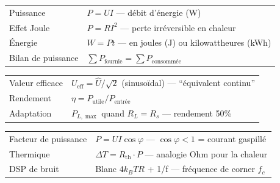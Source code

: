 \documentclass[12pt,a4paper,twoside]{book}
\begin{document}
\begin{bases}[title={\color{white} Résumé --- Les Bases}]
\begin{center}
\renewcommand{\arraystretch}{1.3}
\begin{tabular}{p{4cm}p{9cm}}
\toprule
Puissance & $P = UI$ --- débit d'énergie (W) \\
Effet Joule & $P = RI^2$ --- perte irréversible en chaleur \\
Énergie & $W = Pt$ --- en joules (J) ou kilowattheures (kWh) \\
Bilan de puissance & $\sum P_{\text{fournie}} = \sum P_{\text{consommée}}$ \\
\bottomrule
\end{tabular}
\end{center}
\end{bases}

\begin{approfondissement}[title={\color{white} Résumé --- Approfondissement}]
\begin{center}
\renewcommand{\arraystretch}{1.3}
\begin{tabular}{p{4cm}p{9cm}}
\toprule
Valeur efficace & $U_{\text{eff}} = \hat{U}/\sqrt{2}$ (sinusoïdal) --- ``équivalent continu'' \\
Rendement & $\eta = P_{\text{utile}}/P_{\text{entrée}}$ \\
Adaptation & $P_{L,\max}$ quand $R_L = R_s$ --- rendement 50\% \\
\bottomrule
\end{tabular}
\end{center}
\end{approfondissement}

\begin{ingenieur}[title={\color{white} Résumé --- Niveau Ingénieur}]
\begin{center}
\renewcommand{\arraystretch}{1.3}
\begin{tabular}{p{4cm}p{9cm}}
\toprule
Facteur de puissance & $P = UI\cos\varphi$ --- $\cos\varphi < 1$ = courant gaspillé \\
Thermique & $\Delta T = R_{\text{th}} \cdot P$ --- analogie Ohm pour la chaleur \\
DSP de bruit & Blanc $4k_BTR$ + 1/f --- fréquence de corner $f_c$ \\
\bottomrule
\end{tabular}
\end{center}
\end{ingenieur}

\end{document}
